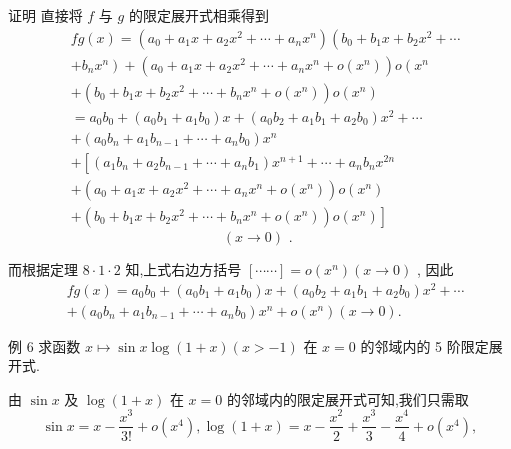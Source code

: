 证明 直接将 $f$ 与 $g$ 的限定展开式相乘得到
\begin{align*}
	&{fg}\left( x\right)  = \left( {{a}_{0} + {a}_{1}x + {a}_{2}{x}^{2} + \cdots  + {a}_{n}{x}^{n}}\right) \left( {{b}_{0} + {b}_{1}x + {b}_{2}{x}^{2} + \cdots }\right.\\
	&\left. {+{b}_{n}{x}^{n}}\right)  + \left( {{a}_{0} + {a}_{1}x + {a}_{2}{x}^{2} + \cdots  + {a}_{n}{x}^{n} + o\left( {x}^{n}\right) }\right) o\left( {x}^{n}\right.\\
	&+ \left( {{b}_{0} + {b}_{1}x + {b}_{2}{x}^{2} + \cdots  + {b}_{n}{x}^{n} + o\left( {x}^{n}\right) }\right) o\left( {x}^{n}\right)\\
	&= {a}_{0}{b}_{0} + \left( {{a}_{0}{b}_{1} + {a}_{1}{b}_{0}}\right) x + \left( {{a}_{0}{b}_{2} + {a}_{1}{b}_{1} + {a}_{2}{b}_{0}}\right) {x}^{2} + \cdots\\
	&+ \left( {{a}_{0}{b}_{n} + {a}_{1}{b}_{n - 1} + \cdots  + {a}_{n}{b}_{0}}\right) {x}^{n}\\
	&+ \left\lbrack  {\left( {{a}_{1}{b}_{n} + {a}_{2}{b}_{n - 1} + \cdots  + {a}_{n}{b}_{1}}\right) {x}^{n + 1} + \cdots  + {a}_{n}{b}_{n}{x}^{2n}}\right.\\
	&+ \left( {{a}_{0} + {a}_{1}x + {a}_{2}{x}^{2} + \cdots  + {a}_{n}{x}^{n} + o\left( {x}^{n}\right) }\right) o\left( {x}^{n}\right)\\
	&\left. {+\left( {{b}_{0} + {b}_{1}x + {b}_{2}{x}^{2} + \cdots  + {b}_{n}{x}^{n} + o\left( {x}^{n}\right) }\right) o\left( {x}^{n}\right) }\right\rbrack
\end{align*}
$$\left( {x \rightarrow  0}\right) \text{ . }$$

而根据定理 $8 \cdot  1 \cdot  2$ 知,上式右边方括号 $\left\lbrack  {\cdots \cdots }\right\rbrack   = o\left( {x}^{n}\right) \left( {x \rightarrow  0}\right)$ , 因此
\begin{align*}
	&{fg}\left( x\right)  = {a}_{0}{b}_{0} + \left( {{a}_{0}{b}_{1} + {a}_{1}{b}_{0}}\right) x + \left( {{a}_{0}{b}_{2} + {a}_{1}{b}_{1} + {a}_{2}{b}_{0}}\right) {x}^{2} + \cdots\\
	&+ \left( {{a}_{0}{b}_{n} + {a}_{1}{b}_{n - 1} + \cdots  + {a}_{n}{b}_{0}}\right) {x}^{n} + o\left( {x}^{n}\right) \left( {x \rightarrow  0}\right) .
\end{align*}

例 6 求函数 $x \mapsto  \sin x\log \left( {1 + x}\right) \left( {x >  - 1}\right)$ 在 $x = 0$ 的邻域内的 5 阶限定展开式.

由 $\sin x$ 及 $\log \left( {1 + x}\right)$ 在 $x = 0$ 的邻域内的限定展开式可知,我们只需取
$$\sin x = x - \frac{{x}^{3}}{3!} + o\left( {x}^{4}\right) ,\log \left( {1 + x}\right)  = x - \frac{{x}^{2}}{2} + \frac{{x}^{3}}{3} - \frac{{x}^{4}}{4} + o\left( {x}^{4}\right) ,$$

